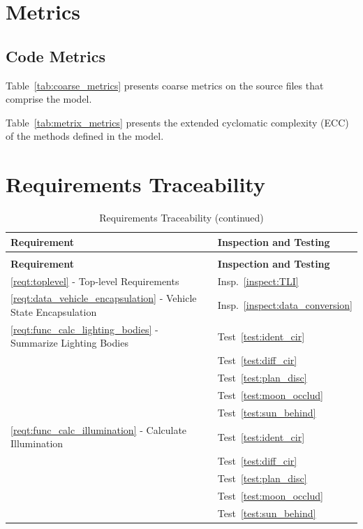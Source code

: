 \section{Metrics}
\subsection{Code Metrics}

Table~\ref{tab:coarse_metrics} presents coarse metrics on the
source files that comprise the model.



Table~\ref{tab:metrix_metrics} presents the extended cyclomatic
complexity
(ECC) of the methods defined in the model.



\section{Requirements Traceability}\label{sec:traceability}

\begin{longtable}[c]{||p{3in}|p{3in}|}
\caption{Requirements Traceability} \\[6pt]
\hline
{\bf Requirement} & {\bf Inspection and Testing} \\
\hline \hline
\endfirsthead
\hline
\endfoot
\caption[]{Requirements Traceability (continued)} \\[6pt]
\hline
{\bf Requirement} & {\bf Inspection and Testing} \\
\hline \hline
\endhead

\ref{reqt:toplevel} - Top-level Requirements &
  Insp.~\ref{inspect:TLI} \\
  \hline

\ref{reqt:data_vehicle_encapsulation} - Vehicle State Encapsulation &
   Insp.~\ref{inspect:data_conversion} \\
\hline

\ref{reqt:func_calc_lighting_bodies} - Summarize Lighting Bodies &
   Test~\ref{test:ident_cir} \\
   &Test~\ref{test:diff_cir} \\
   &Test~\ref{test:plan_disc} \\
   &Test~\ref{test:moon_occlud} \\
   &Test~\ref{test:sun_behind} \\
\hline

\ref{reqt:func_calc_illumination} - Calculate Illumination &
   Test~\ref{test:ident_cir} \\
   &Test~\ref{test:diff_cir} \\
   &Test~\ref{test:plan_disc} \\
   &Test~\ref{test:moon_occlud} \\
   &Test~\ref{test:sun_behind} \\
\hline

\end{longtable}
